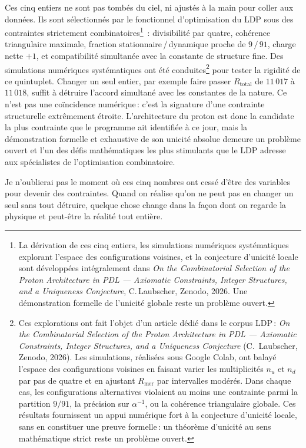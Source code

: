 \documentclass[12pt, a4paper, openright]{book}
\begin{document}
Ces cinq entiers ne sont pas tombés du ciel, ni ajustés à la main pour coller aux données. Ils sont sélectionnés par le fonctionnel d'optimisation du LDP sous des contraintes strictement combinatoires\footnote{La dérivation de ces cinq entiers, les simulations numériques systématiques explorant l'espace des configurations voisines, et la conjecture d'unicité locale sont développées intégralement dans \textit{On the Combinatorial Selection of the Proton Architecture in PDL --- Axiomatic Constraints, Integer Structures, and a Uniqueness Conjecture}, C.\,Laubscher, Zenodo, 2026. Une démonstration formelle de l'unicité globale reste un problème ouvert.}~: divisibilité par quatre, cohérence triangulaire maximale, fraction stationnaire\,/\,dynamique proche de $9\,/\,91$, charge nette $+1$, et compatibilité simultanée avec la constante de structure fine. Des simulations numériques systématiques ont été conduites\footnote{Ces explorations ont fait l'objet d'un article dédié dans le corpus LDP\,: \emph{On the Combinatorial Selection of the Proton Architecture in PDL --- Axiomatic Constraints, Integer Structures, and a Uniqueness Conjecture} (C.\ Laubscher, Zenodo, 2026). Les simulations, réalisées sous Google Colab, ont balayé l'espace des configurations voisines en faisant varier les multiplicités $n_u$ et $n_d$ par pas de quatre et en ajustant $R_\text{mer}$ par intervalles modérés. Dans chaque cas, les configurations alternatives violaient au moins une contrainte parmi la partition $9/91$, la précision sur $\alpha^{-1}$, ou la cohérence triangulaire globale. Ces résultats fournissent un appui numérique fort à la conjecture d'unicité locale, sans en constituer une preuve formelle\,: un théorème d'unicité au sens mathématique strict reste un problème ouvert.} pour tester la rigidité de ce quintuplet. Changer un seul entier, par exemple faire passer $R_\text{total}$ de $11\,017$ à $11\,018$, suffit à détruire l'accord simultané avec les constantes de la nature. Ce n'est pas une coïncidence numérique\,: c'est la signature d'une contrainte structurelle extrêmement étroite. L'architecture du proton est donc la candidate la plus contrainte que le programme ait identifiée à ce jour, mais la démonstration formelle et exhaustive de son unicité absolue demeure un problème ouvert et l'un des défis mathématiques les plus stimulants que le LDP adresse aux spécialistes de l'optimisation combinatoire.

\medskip

Je n'oublierai pas le moment où ces cinq nombres ont cessé d'être des variables pour devenir des contraintes. Quand on réalise qu'on ne peut pas en changer un seul sans tout détruire, quelque chose change dans la façon dont on regarde la physique et peut-être la réalité tout entière.
\end{document}
